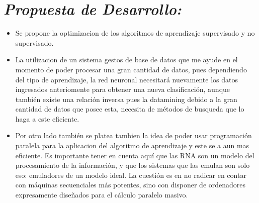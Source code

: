 \documentclass[journal]{IEEEtran}
\begin{document}
\section{\textbf{\emph{Propuesta de Desarrollo:}}}

\begin{itemize}
\item Se propone la optimizacion de los algoritmos de aprendizaje supervisado y no supervisado.
        
\item La utilizacion de un sistema gestos de base de datos que me ayude en el momento de poder procesar una gran cantidad de datos, pues dependiendo del tipo de aprendizaje, la red neuronal necesitará nuevamente los datos ingresados anteriomente para obtener una nueva clasificación, aunque también existe una relación inversa pues la datamining debido a la gran cantidad de datos que posee esta, necesita de métodos de busqueda que lo haga a este eficiente.
        
\item Por otro lado también se platea tambien la idea de poder usar programación paralela para la aplicacion del algoritmo de aprendizaje y este se a aun mas eficiente. Es importante tener en cuenta aquí que las RNA son un modelo del procesamiento de la información, y que los sistemas que las emulan son solo eso: emuladores de un modelo ideal. La cuestión es en no radicar en contar con máquinas secuenciales más potentes, sino con disponer de ordenadores expresamente diseñados para el cálculo paralelo masivo.
\end{itemize}
\end{document}
